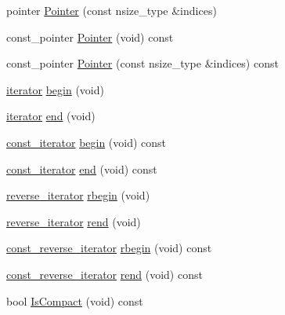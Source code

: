 \begin{DoxyCompactItemize}
\item 
pointer \hyperlink{classvct_dynamic_n_array_owner_a9f4590a546fb746b8c946389fab3743c}{Pointer} (const nsize\+\_\+type \&indices)
\item 
const\+\_\+pointer \hyperlink{classvct_dynamic_n_array_owner_a1599dc602921a75b03a6c9a74e2f0d9a}{Pointer} (void) const 
\item 
const\+\_\+pointer \hyperlink{classvct_dynamic_n_array_owner_a600f72fc3f92defc2ff04b536bbd21b0}{Pointer} (const nsize\+\_\+type \&indices) const 
\item 
\hyperlink{classvct_dynamic_n_array_owner_a48e740eae5c0a1654e5e93b12d388c19}{iterator} \hyperlink{classvct_dynamic_n_array_owner_a6e91f5e7d1f1b04fb69937aa4f1adbfd}{begin} (void)
\item 
\hyperlink{classvct_dynamic_n_array_owner_a48e740eae5c0a1654e5e93b12d388c19}{iterator} \hyperlink{classvct_dynamic_n_array_owner_a6cb3579addc28099853f114e8365501c}{end} (void)
\item 
\hyperlink{classvct_dynamic_n_array_owner_a81e092a15fe8a5bf0777a8b1f9cc8e4a}{const\+\_\+iterator} \hyperlink{classvct_dynamic_n_array_owner_a804091eb62274eba5399b03a8075a35b}{begin} (void) const 
\item 
\hyperlink{classvct_dynamic_n_array_owner_a81e092a15fe8a5bf0777a8b1f9cc8e4a}{const\+\_\+iterator} \hyperlink{classvct_dynamic_n_array_owner_af77223e152308f1508c2409fa81415e8}{end} (void) const 
\item 
\hyperlink{classvct_dynamic_n_array_owner_a9b4b9b8c6f7e3cfe9bdf9aedbdda6f0d}{reverse\+\_\+iterator} \hyperlink{classvct_dynamic_n_array_owner_a4a0ce4cbac1a4714f1aef1663d90b9b9}{rbegin} (void)
\item 
\hyperlink{classvct_dynamic_n_array_owner_a9b4b9b8c6f7e3cfe9bdf9aedbdda6f0d}{reverse\+\_\+iterator} \hyperlink{classvct_dynamic_n_array_owner_afcfe6ed0bff69625af0de37f1f34cfba}{rend} (void)
\item 
\hyperlink{classvct_dynamic_n_array_owner_a3c8cf0902cf51a404fc00cee4aac3f46}{const\+\_\+reverse\+\_\+iterator} \hyperlink{classvct_dynamic_n_array_owner_a75c23cdbbc41b86693b82bd45b894172}{rbegin} (void) const 
\item 
\hyperlink{classvct_dynamic_n_array_owner_a3c8cf0902cf51a404fc00cee4aac3f46}{const\+\_\+reverse\+\_\+iterator} \hyperlink{classvct_dynamic_n_array_owner_a985d7d011924469151dda6c9327a27ff}{rend} (void) const 
\item 
bool \hyperlink{classvct_dynamic_n_array_owner_a417fa6c312a72fd48c6a59b685b77aa5}{Is\+Compact} (void) const 

\end{DoxyCompactItemize}
